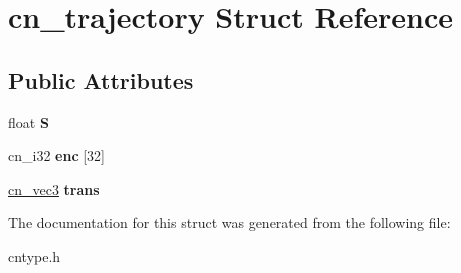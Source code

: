 \hypertarget{structcn__trajectory}{\section{cn\-\_\-trajectory Struct Reference}
\label{structcn__trajectory}
}
\subsection*{Public Attributes}
\begin{DoxyCompactItemize}
\item 
\hypertarget{structcn__trajectory_a7fbeafd99f110e03628778d4e75d17d5}{float {\bfseries S}}\label{structcn__trajectory_a7fbeafd99f110e03628778d4e75d17d5}

\item 
\hypertarget{structcn__trajectory_ade558abb9665772483d2ecc5c9e5bb8f}{cn\-\_\-i32 {\bfseries enc} \mbox{[}32\mbox{]}}\label{structcn__trajectory_ade558abb9665772483d2ecc5c9e5bb8f}

\item 
\hypertarget{structcn__trajectory_a2dfa1493cf16d182de347eb4b224729e}{\hyperlink{structcn__vec3}{cn\-\_\-vec3} {\bfseries trans}}\label{structcn__trajectory_a2dfa1493cf16d182de347eb4b224729e}

\end{DoxyCompactItemize}


The documentation for this struct was generated from the following file\-:\begin{DoxyCompactItemize}
\item 
cntype.\-h\end{DoxyCompactItemize}
